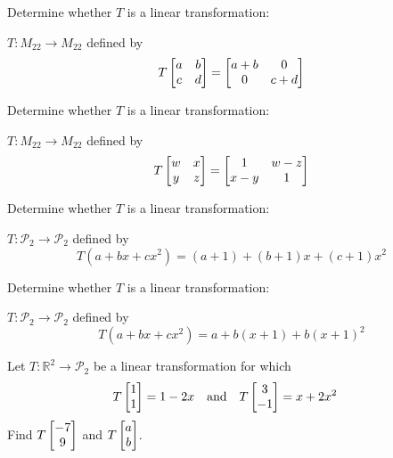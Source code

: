 \documentclass[boxes]{gsypset}
\begin{document}
	\begin{problem}[6.4.1]
		Determine whether $T$ is a linear transformation:
		
		$T: M_{22} \to M_{22}$ defined by
		\[
			T\begin{bmatrix}a&b\\c&d\end{bmatrix} = \begin{bmatrix}a+b&0\\0&c+d\end{bmatrix}
		\]
	\end{problem}
	\begin{solution}
		
	\end{solution}
	
	\begin{problem}[6.4.2]
		Determine whether $T$ is a linear transformation:
		
		$T: M_{22} \to M_{22}$ defined by
		\[
			T\begin{bmatrix}w&x\\y&z\end{bmatrix} = \begin{bmatrix}1&w-z\\x-y&1\end{bmatrix}
		\]
	\end{problem}
	\begin{solution}
		
	\end{solution}
	
	\begin{problem}[6.4.8]
		Determine whether $T$ is a linear transformation:
		
		$T: \mathscr{P}_2 \to \mathscr{P}_2$ defined by
		\[
			T(a + bx + cx^2) = (a+1) + (b+1)x + (c+1)x^2
		\]
	\end{problem}
	\begin{solution}
		
	\end{solution}
	
	\begin{problem}[6.4.9]
		Determine whether $T$ is a linear transformation:
		
		$T: \mathscr{P}_2 \to \mathscr{P}_2$ defined by
		\[
			T(a + bx + cx^2) = a + b(x+1) + b(x+1)^2
		\]
	\end{problem}
	\begin{solution}
		
	\end{solution}
	
	\begin{problem}[6.4.15]
		Let $T: \mathbb{R}^2 \to \mathscr{P}_2$ be a linear transformation for which
		\begin{align*}
			T\begin{bmatrix}1\\1\end{bmatrix} &= 1 - 2x &
			&\text{and}&
			T\begin{bmatrix}3\\-1\end{bmatrix} &= x + 2x^2
		\end{align*}
		Find $T\begin{bmatrix}-7\\9\end{bmatrix}$ and $T\begin{bmatrix}a\\b\end{bmatrix}$.
	\end{problem}
	\begin{solution}
		
	\end{solution}
	
\end{document}
